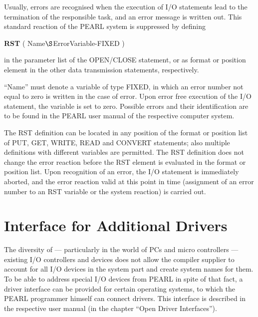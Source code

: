 Usually, errors are recognised when the execution of I/O statements lead to the
termination of the responsible task, and an error message is written
out. This standard reaction of the PEARL system is suppressed by
defining

{\bf RST} ( Name$\S $ErrorVariable-FIXED )

in the parameter list of the OPEN/CLOSE statement, or as format or
position element in the other data transmission statements,
respectively.

``Name'' must denote a variable of type FIXED, in which an error number
not equal to zero is written in the case of error. Upon error free
execution of the I/O statement, the variable is set to zero. Possible
errors and their identification are to be found in the PEARL user manual
of the respective computer system.

The RST definition can be located in any position of the format or
position list of PUT, GET, WRITE, READ and CONVERT statements; also
multiple definitions with different variables are permitted. The RST
definition does not change the error reaction before the RST element is
evaluated in the format or position list. Upon recognition of an error,
the I/O statement is immediately aborted, and the error reaction valid
at this point in time (assignment of an error number to an RST variable
or the system reaction) is carried out.

\section{Interface for Additional Drivers}   %
\label{sec_driver_interface}

The diversity of --- particularly in the world of PCs 
and micro controllers --- existing I/O
controllers and devices does not allow the compiler supplier to account
for all I/O devices in the system part and create system names for them.
To be able to address special I/O devices from PEARL in spite of that
fact, a driver interface can be provided for certain operating systems,
to which the PEARL programmer himself can connect drivers. This
interface is described in the respective user manual (in the chapter
``Open Driver Interfaces'').


